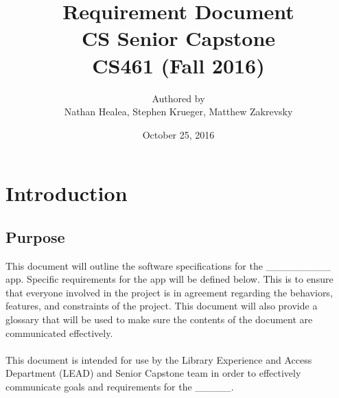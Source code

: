 \documentclass[letterpaper,10pt,titlepage]{article}
\title{Requirement Document \\ CS Senior Capstone \\ \vspace{2mm}\small CS461 (Fall 2016)}
\author{Authored by \\ Nathan Healea, Stephen Krueger, Matthew Zakrevsky}
\date{October 25, 2016}
\begin{document}
\maketitle
\newpage

\section{Introduction}

\subsection{Purpose}
This document will outline the software specifications for the \_\_\_\_\_\_\_\_\_ app. Specific requirements for the app will be defined below. This is to ensure that everyone involved in the project is in agreement regarding the behaviors, features, and constraints of the project. This document will also provide a glossary that will be used to make sure the contents of the document are communicated effectively. \\ 
\\
This document is intended for use by the  Library Experience and Access Department (LEAD) and Senior Capstone team in order to effectively communicate goals and requirements for the \_\_\_\_\_.    
\end{document}
